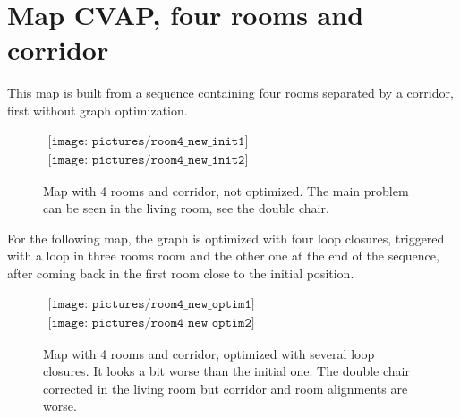 \clearpage
\section{Map CVAP, four rooms and corridor}

This map is built from a sequence containing four rooms separated by a corridor, first without graph optimization. 

\begin{figure}[H]
\centering$
 \begin{array}{c}
 \texttt{[image: pictures/room4\_new\_init1]}\\
 \texttt{[image: pictures/room4\_new\_init2]}
 \end{array}$
\caption{Map with 4 rooms and corridor, not optimized. The main problem can be seen in the living room, see the double chair.}
\end{figure}

\clearpage
For the following map, the graph is optimized with four loop closures, triggered with a loop in three rooms room and the other one at the end of the sequence, after coming back in the first room close to the initial position.

\begin{figure}[H]
\centering$
 \begin{array}{c}
 \texttt{[image: pictures/room4\_new\_optim1]}\\
 \texttt{[image: pictures/room4\_new\_optim2]}
 \end{array}$
\caption{Map with 4 rooms and corridor, optimized with several loop closures. It looks a bit worse than the initial one. The double chair corrected in the living room but corridor and room alignments are worse.}
\end{figure}

